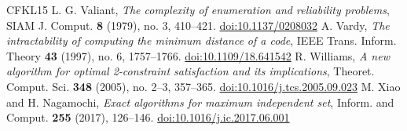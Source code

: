 \begin{thebibliography}{CFKL15}
 L. G. Valiant, \emph{The complexity of enumeration and reliability problems}, SIAM J. Comput. \textbf{8} (1979), no. 3, 410--421. \href{https://doi.org/10.1137/0208032}{doi:10.1137/0208032}
 A. Vardy, \emph{The intractability of computing the minimum distance of a code}, IEEE Trans. Inform. Theory \textbf{43} (1997), no. 6, 1757--1766. \href{https://doi.org/10.1109/18.641542}{doi:10.1109/18.641542}
 R. Williams, \emph{A new algorithm for optimal 2-constraint satisfaction and its implications}, Theoret. Comput. Sci. \textbf{348} (2005), no. 2--3, 357--365. \href{https://doi.org/10.1016/j.tcs.2005.09.023}{doi:10.1016/j.tcs.2005.09.023}
 M. Xiao and H. Nagamochi, \emph{Exact algorithms for maximum independent set}, Inform. and Comput. \textbf{255} (2017), 126--146. \href{https://doi.org/10.1016/j.ic.2017.06.001}{doi:10.1016/j.ic.2017.06.001}
\end{thebibliography}
